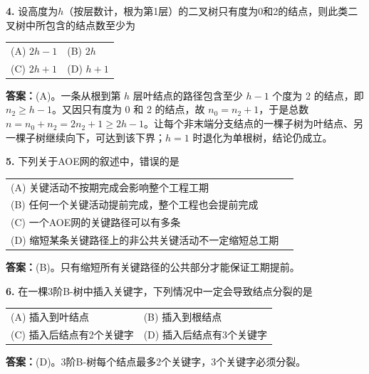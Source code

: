 \vspace{6pt}

\noindent\textbf{4.} 设高度为$h$（按层数计，根为第1层）的二叉树只有度为0和2的结点，则此类二叉树中所包含的结点数至少为
\begin{center}
\begin{tabular}{ll}
(A) $2h-1$ & (B) $2h$ \\[6pt]
(C) $2h+1$ & (D) $h+1$
\end{tabular}
\end{center}

\ifshowsolutions\par\noindent\textbf{答案：}(A)。一条从根到第 $h$ 层叶结点的路径包含至少 $h-1$ 个度为 2 的结点，即 $n_2\ge h-1$。又因只有度为 0 和 2 的结点，故 $n_0=n_2+1$，于是总数 $n=n_0+n_2=2n_2+1\ge2h-1$。让每个非末端分支结点的一棵子树为叶结点、另一棵子树继续向下，可达到该下界；$h=1$ 时退化为单根树，结论仍成立。\else \answerarea \fi

\vspace{6pt}

\noindent\textbf{5.} 下列关于AOE网的叙述中，错误的是
\begin{center}
\begin{tabular}{ll}
(A) 关键活动不按期完成会影响整个工程工期 \\[4pt]
(B) 任何一个关键活动提前完成，整个工程也会提前完成 \\[4pt]
(C) 一个AOE网的关键路径可以有多条 \\[4pt]
(D) 缩短某条关键路径上的非公共关键活动不一定缩短总工期
\end{tabular}
\end{center}

\ifshowsolutions\par\noindent\textbf{答案：}(B)。只有缩短所有关键路径的公共部分才能保证工期提前。\else \answerarea \fi

\vspace{6pt}

\noindent\textbf{6.} 在一棵3阶B-树中插入关键字，下列情况中一定会导致结点分裂的是
\begin{center}
\begin{tabular}{ll}
(A) 插入到叶结点 & (B) 插入到根结点 \\[6pt]
(C) 插入后结点有2个关键字 & (D) 插入后结点有3个关键字
\end{tabular}
\end{center}

\ifshowsolutions\par\noindent\textbf{答案：}(D)。3阶B-树每个结点最多2个关键字，3个关键字必须分裂。\else \answerarea \fi

